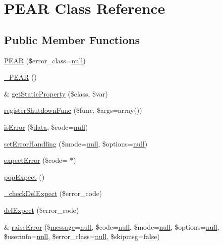 \hypertarget{classPEAR}{}\section{P\+E\+AR Class Reference}
\label{classPEAR}
\subsection*{Public Member Functions}
\begin{DoxyCompactItemize}
\item 
\hyperlink{classPEAR_a1dc6fd8c04eca33173cc78556178b980}{P\+E\+AR} (\$error\+\_\+class=\hyperlink{modernizr_8min_8js_a286f9ec831c5e676eeb493248eab9575}{null})
\item 
\hyperlink{classPEAR_a282c57b5152ef70d02b3f08ad826af0a}{\+\_\+\+P\+E\+AR} ()
\item 
\& \hyperlink{classPEAR_ac189aee05eb30e8926a952cdf8eb9d02}{get\+Static\+Property} (\$class, \$var)
\item 
\hyperlink{classPEAR_aa2575aa1fe7e5b46b99c35aaa367b04c}{register\+Shutdown\+Func} (\$func, \$args=array())
\item 
\hyperlink{classPEAR_aa2608099ea852b3e982928aab10482ba}{is\+Error} (\$\hyperlink{document__category_8js_a94b4f25375ac17cb917012e05bf514a7}{data}, \$code=\hyperlink{modernizr_8min_8js_a286f9ec831c5e676eeb493248eab9575}{null})
\item 
\hyperlink{classPEAR_abb8e73d9d49ad896205667c412332ffb}{set\+Error\+Handling} (\$mode=\hyperlink{modernizr_8min_8js_a286f9ec831c5e676eeb493248eab9575}{null}, \$options=\hyperlink{modernizr_8min_8js_a286f9ec831c5e676eeb493248eab9575}{null})
\item 
\hyperlink{classPEAR_a57f021082c2e63f78a9f7bfd5b10f14b}{expect\+Error} (\$code= \textquotesingle{}$\ast$\textquotesingle{})
\item 
\hyperlink{classPEAR_a3ea2df43e39214a29f77f8773a5afcc4}{pop\+Expect} ()
\item 
\hyperlink{classPEAR_a6350d6f88347be3704dc5967915a7ada}{\+\_\+check\+Del\+Expect} (\$error\+\_\+code)
\item 
\hyperlink{classPEAR_a8aa91fd0c4d61435587519c0417848c5}{del\+Expect} (\$error\+\_\+code)
\item 
\& \hyperlink{classPEAR_add7f8b82b573935527decd2e1af6065d}{raise\+Error} (\$\hyperlink{classmessage}{message}=\hyperlink{modernizr_8min_8js_a286f9ec831c5e676eeb493248eab9575}{null}, \$code=\hyperlink{modernizr_8min_8js_a286f9ec831c5e676eeb493248eab9575}{null}, \$mode=\hyperlink{modernizr_8min_8js_a286f9ec831c5e676eeb493248eab9575}{null}, \$options=\hyperlink{modernizr_8min_8js_a286f9ec831c5e676eeb493248eab9575}{null}, \$userinfo=\hyperlink{modernizr_8min_8js_a286f9ec831c5e676eeb493248eab9575}{null}, \$error\+\_\+class=\hyperlink{modernizr_8min_8js_a286f9ec831c5e676eeb493248eab9575}{null}, \$skipmsg=false)

\end{DoxyCompactItemize}

